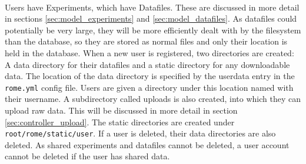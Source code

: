 \paragraph{}
Users have Experiments, which have Datafiles. These are discussed in more detail in sections  \ref{sec:model_experiments} and  \ref{sec:model_datafiles}. As datafiles could potentially be very large, they will be more efficiently dealt with by the filesystem than the database, so they are stored as normal files and only their location is held in the database. When a new user is registered, two directories are created: A data directory for their datafiles and a static directory for any downloadable data. The location of the data directory is specified by the userdata entry in the \texttt{rome.yml} config file. Users are given a directory under this location named with their username. A subdirectory called uploads is also created, into which they can upload raw data. This will be discussed in more detail in section \ref{sec:controller_upload}. The static directories are created under \texttt{root/rome/static/user}. If a user is deleted, their data directories are also deleted. As shared experiments and datafiles cannot be deleted, a user account cannot be deleted if the user has shared data. 


